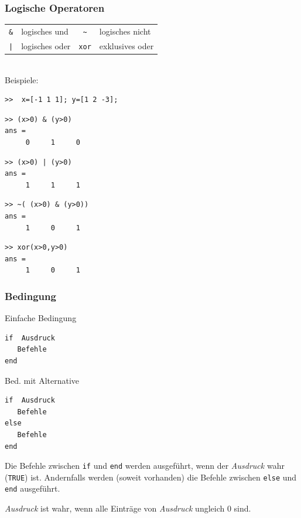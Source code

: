 %
%
%
\begin{frame}[fragile]\frametitle{Logische Operatoren}
\begin{tabular}{||c|l||c|l||}
\hline
\lstinline!&! & logisches und & \lstinline!~! & logisches nicht \\
\lstinline!|! & logisches oder & \lstinline!xor! & exklusives oder\\
\hline
\end{tabular}
\\
Beispiele:\\
\begin{lstlisting} 
>>  x=[-1 1 1]; y=[1 2 -3];
\end{lstlisting}
\vspace*{0.5cm}
\begin{minipage}{5cm}
\begin{lstlisting}
>> (x>0) & (y>0)
ans =
     0     1     0
\end{lstlisting}
\vspace*{0.5cm}
\begin{lstlisting}
>> (x>0) | (y>0)
ans =
     1     1     1
\end{lstlisting}
\end{minipage} \hfill
\begin{minipage}{5cm}
\begin{lstlisting}
>> ~( (x>0) & (y>0))
ans =
     1     0     1
\end{lstlisting}
\vspace*{0.5cm}
\begin{lstlisting}
>> xor(x>0,y>0)
ans =
     1     0     1
\end{lstlisting}
\end{minipage}
\end{frame}
%
%
%
\begin{frame}[fragile]\frametitle{Bedingung}
\begin{minipage}{5cm}
Einfache Bedingung
\begin{lstlisting}
if  Ausdruck
   Befehle
end
\end{lstlisting}
\end{minipage} \hfill 
\begin{minipage}{5.5cm}
Bed. mit Alternative
\begin{lstlisting}
if  Ausdruck
   Befehle
else
   Befehle
end
\end{lstlisting}
\end{minipage}
Die Befehle zwischen \lstinline!if! und \lstinline!end! werden ausgeführt, wenn
der {\it Ausdruck} wahr (\lstinline!TRUE!) ist. 
Andernfalls werden (soweit vorhanden) die
Befehle zwischen \lstinline!else! und \lstinline!end! ausgeführt.

{\it Ausdruck} ist wahr, wenn   alle Einträge von {\it
  Ausdruck} ungleich $0$ sind.
\end{frame}
